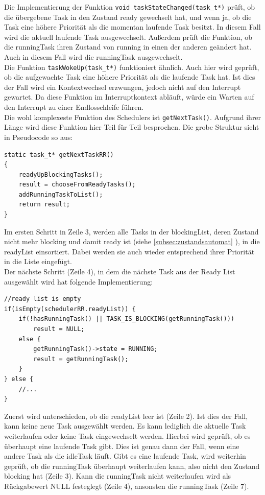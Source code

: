 \documentclass[fontsize=12pt, toc=bibliography, notitlepage]{scrreprt}
\newcommand{\refnn}[1]{\ref{#1} \nameref{#1}}
\begin{document}
Die Implementierung der Funktion \lstinline$void taskStateChanged(task_t*)$ prüft, ob die übergebene Task in den Zustand ready gewechselt hat, und wenn ja, ob die Task eine höhere Priorität als die momentan laufende Task besitzt. In diesem Fall wird die aktuell laufende Task ausgewechselt. Außerdem prüft die Funktion, ob die runningTask ihren Zustand von running in einen der anderen geändert hat. Auch in diesem Fall wird die runningTask ausgewechselt.\\

Die Funktion \lstinline$taskWokeUp(task_t*)$ funktioniert ähnlich. Auch hier wird geprüft, ob die aufgewachte Task eine höhere Priorität als die laufende Task hat. Ist dies der Fall wird ein Kontextwechsel erzwungen, jedoch nicht auf den Interrupt gewartet. Da diese Funktion im Interruptkontext abläuft, würde ein Warten auf den Interrupt zu einer Endlosschleife führen.\\

Die wohl komplexeste Funktion des Schedulers ist \lstinline$getNextTask()$. Aufgrund ihrer Länge wird diese Funktion hier Teil für Teil besprochen. Die grobe Struktur sieht in Pseudocode so aus:

\begin{lstlisting}
static task_t* getNextTaskRR()
{
	readyUpBlockingTasks();
	result = chooseFromReadyTasks();
	addRunningTaskToList();
	return result;
}
\end{lstlisting}

Im ersten Schritt in Zeile 3, werden alle Tasks in der blockingList, deren Zustand nicht mehr blocking und damit ready ist (siehe \refnn{subsec:zustandsautomat}), in die readyList einsortiert. Dabei werden sie auch wieder entsprechend ihrer Priorität in die Liste eingefügt.\\

Der nächste Schritt (Zeile 4), in dem die nächste Task aus der Ready List ausgewählt wird hat folgende Implementierung:

\begin{lstlisting}[title=schedulerRR.c]
//ready list is empty
if(isEmpty(schedulerRR.readyList)) {
	if(!hasRunningTask() || TASK_IS_BLOCKING(getRunningTask()))
		result = NULL;
	else {
		getRunningTask()->state = RUNNING;
		result = getRunningTask();
	}
} else {
	//...
}
\end{lstlisting}

Zuerst wird unterschieden, ob die readyList leer ist (Zeile 2). Ist dies der Fall, kann keine neue Task ausgewählt werden. Es kann lediglich die aktuelle Task weiterlaufen oder keine Task eingewechselt werden. Hierbei wird geprüft, ob es überhaupt eine laufende Task gibt. Dies ist genau dann der Fall, wenn eine andere Task als die idleTask läuft. Gibt es eine laufende Task, wird weiterhin geprüft, ob die runningTask überhaupt weiterlaufen kann, also nicht den Zustand blocking hat (Zeile 3). Kann die runningTask nicht weiterlaufen wird als Rückgabewert NULL festeglegt (Zeile 4), ansonsten die runningTask (Zeile 7).\\
\end{document}
